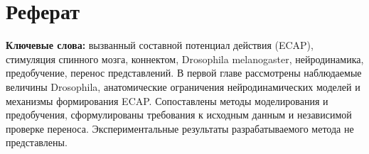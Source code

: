 \chapter*{Реферат}
\WorkingTitle\par
\AuthorName\par
\medskip
\noindent\textbf{Ключевые слова:} вызванный составной потенциал действия (ECAP), стимуляция спинного мозга, коннектом, Drosophila melanogaster, нейродинамика, предобучение, перенос представлений.
\medskip
В первой главе рассмотрены наблюдаемые величины Drosophila, анатомические ограничения нейродинамических моделей и механизмы формирования ECAP. Сопоставлены методы моделирования и предобучения, сформулированы требования к исходным данным и независимой проверке переноса. Экспериментальные результаты разрабатываемого метода не представлены.

